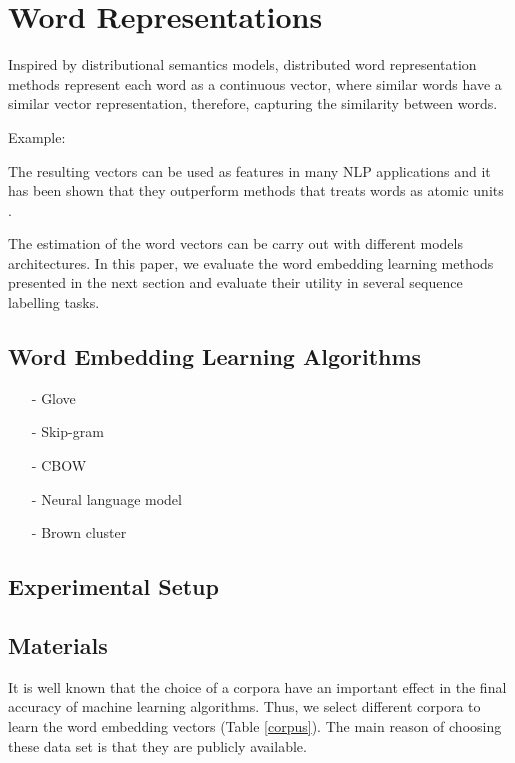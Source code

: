 \documentclass[11pt]{article}
\begin{document}
\section{Word Representations}


Inspired by distributional semantics models, distributed word
representation methods represent each word as a continuous vector, where
similar words have a similar vector representation, therefore, capturing
the similarity between words.

Example: 

The resulting vectors can be used as features in many NLP applications and it has been shown that they outperform methods that treats words as atomic units \cite{}.

The estimation of the word vectors can be carry out with different models architectures. In this paper, we evaluate the word embedding learning methods presented in the next section and evaluate their utility in several sequence labelling tasks.
 
\subsection{Word Embedding Learning Algorithms}
\begin{itemize}
\item[-] Glove \cite{pennington2014glove}
\item[-] Skip-gram \cite{Mikolov13}
\item[-] CBOW \cite{Mikolov13}
\item[-] Neural language model \cite{Turian10wordrepresentations}
\item[-] Brown cluster \cite{Brown92class-basedn-gram}
\end{itemize}





\subsection{Experimental Setup}

\subsection{Materials}
It is well known that the choice of a corpora have an important effect in the final accuracy of machine learning algorithms. 
Thus, we select different corpora to learn the word embedding vectors (Table \ref{corpus}).
The main reason of choosing these data set is that they are publicly available. 
\end{document}
